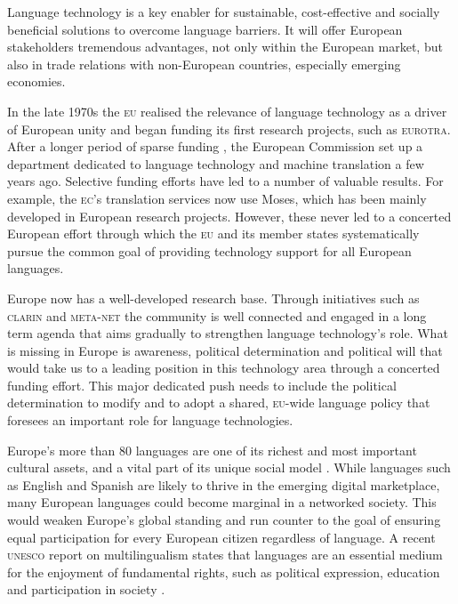 \documentclass[output=paper]{LSP/langsci}
\begin{document}
Language technology is a key enabler for sustainable, cost-effective
and socially beneficial solutions to overcome language barriers. It
will offer European stakeholders tremendous advantages, not only
within the European market, but also in trade relations with
non-European countries, especially emerging economies.

In the late 1970s the \textsc{eu} realised the relevance of language technology
as a driver of European unity and began funding its first research
projects, such as \textsc{eurotra}. After a longer period of sparse funding
\citep{euromap, laz1}, the European Commission set up a department
dedicated to language technology and machine translation a few years
ago. Selective funding efforts have led to a number of valuable
results. For example, the \textsc{ec}'s translation services now use Moses,
which has been mainly developed in European research
projects. However, these never led to a concerted European effort
through which the \textsc{eu} and its member states systematically pursue the
common goal of providing technology support for all European
languages.

Europe now has a well-developed research base. Through initiatives
such as \textsc{clarin} and \textsc{meta-net} the community is well connected and
engaged in a long term agenda that aims gradually to strengthen
language technology's role. What is missing in Europe is awareness,
political determination and political will that would take us to a
leading position in this technology area through a concerted funding
effort. This major dedicated push needs to include the political
determination to modify and to adopt a shared, \textsc{eu}-wide language policy
that foresees an important role for language technologies.

Europe's more than 80 languages are one of its richest and most
important cultural assets, and a vital part of its unique social model
\citep{EC2,eurobarometer2012}. While languages such as English and
Spanish are likely to thrive in the emerging digital marketplace, many
European languages could become marginal in a networked society. This
would weaken Europe's global standing and run counter to the goal of
ensuring equal participation for every European citizen regardless of
language. A recent \textsc{unesco} report on multilingualism states that
languages are an essential medium for the enjoyment of fundamental
rights, such as political expression, education and participation in
society \citep{Unesco1,ifa2008,ifa2011,maaya2012}.
\end{document}

